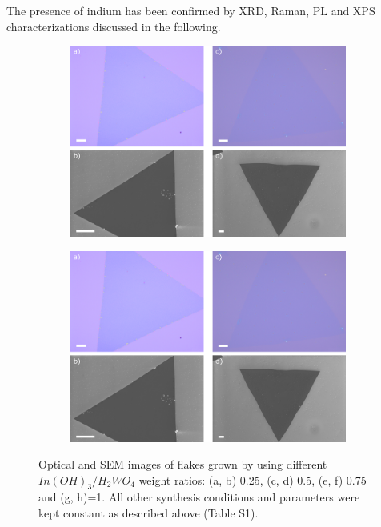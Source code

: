 The presence of indium has been confirmed by XRD, Raman, PL and XPS characterizations discussed in the following.

\begin{figure}[!ht]
	\begin{center}
		\begin{subfigure}[b]{1\textwidth}
			\includegraphics[scale=0.35]{In/OMSEMImages1.png}
			\label{fig:InOMSEMImages1}
		\end{subfigure}
		\qquad
		\begin{subfigure}[b]{1\textwidth}
			\includegraphics[scale=0.35]{In/OMSEMImages1.png}
			\label{fig:InOMSEMImages2}
		\end{subfigure}
		\caption{Optical and SEM images of flakes grown by using different $In(OH)_3/H_2WO_4$ weight ratios: (a, b) 0.25, (c, d) 0.5, (e, f) 0.75 and (g, h)=1. All other synthesis conditions and parameters were kept constant as described above (Table S1).}
		\label{fig:InOMSEMImages}
	\end{center}
\end{figure}

